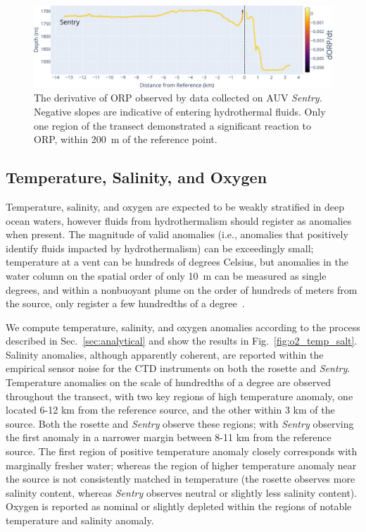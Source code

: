 \begin{figure}[h!]
    \centering
    \includegraphics[width=\columnwidth]{figures/chap3_orp_over_distance.jpg}
    \caption[Oxidation-reduction potential measurements collected during transect]{The derivative of ORP observed by data collected on AUV \emph{Sentry}. Negative slopes are indicative of entering hydrothermal fluids. Only one region of the transect demonstrated a significant reaction to ORP, within \SI{200}{\meter} of the reference point.}
    \label{fig:orp_distance}
\end{figure}

\subsection{Temperature, Salinity, and Oxygen}
\label{sec:o2_temp_salt}
Temperature, salinity, and oxygen are expected to be weakly stratified in deep ocean waters, however fluids from hydrothermalism should register as anomalies when present. The magnitude of valid anomalies (i.e., anomalies that positively identify fluids impacted by hydrothermalism) can be exceedingly small; temperature at a vent can be hundreds of degrees Celsius, but anomalies in the water column on the spatial order of only \SI{10}{\meter} can be measured as single degrees, and within a nonbuoyant plume on the order of hundreds of meters from the source, only register a few hundredths of a degree~\autocite{yoerger2007autonomous}. 

We compute temperature, salinity, and oxygen anomalies according to the process described in Sec.~\ref{sec:analytical} and show the results in Fig.~\ref{fig:o2_temp_salt}. Salinity anomalies, although apparently coherent, are reported within the empirical sensor noise for the CTD instruments on both the rosette and \emph{Sentry}. Temperature anomalies on the scale of hundredths of a degree are observed throughout the transect, with two key regions of high temperature anomaly, one located 6-12 km from the reference source, and the other within 3 km of the source. Both the rosette and \emph{Sentry} observe these regions; with \emph{Sentry} observing the first anomaly in a narrower margin between 8-11 km from the reference source. The first region of positive temperature anomaly closely corresponds with marginally fresher water; whereas the region of higher temperature anomaly near the source is not consistently matched in temperature (the rosette observes more salinity content, whereas \emph{Sentry} observes neutral or slightly less salinity content). Oxygen is reported as nominal or slightly depleted within the regions of notable temperature and salinity anomaly.

